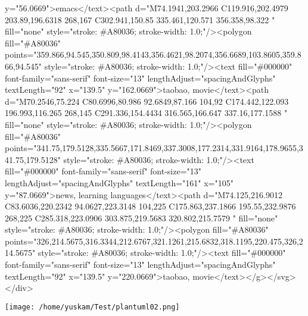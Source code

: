 \documentclass[11pt]{article}
\begin{document}
\begin{HTML}
y="56.0669">emacs</text><path d="M74.1941,203.2966 C119.916,202.4979 203.89,196.6318 268,167 C302.941,150.85 335.461,120.571 356.358,98.322 " fill="none" style="stroke: \#A80036; stroke-width: 1.0;"/><polygon fill="\#A80036" points="359.866,94.545,350.809,98.4143,356.4621,98.2074,356.6689,103.8605,359.866,94.545" style="stroke: \#A80036; stroke-width: 1.0;"/><text fill="\#000000" font-family="sans-serif" font-size="13" lengthAdjust="spacingAndGlyphs" textLength="92" x="139.5" y="162.0669">taobao, movie</text><path d="M70.2546,75.224 C80.6996,80.986 92.6849,87.166 104,92 C174.442,122.093 196.993,116.265 268,145 C291.336,154.4434 316.565,166.647 337.16,177.1588 " fill="none" style="stroke: \#A80036; stroke-width: 1.0;"/><polygon fill="\#A80036" points="341.75,179.5128,335.5667,171.8469,337.3008,177.2314,331.9164,178.9655,341.75,179.5128" style="stroke: \#A80036; stroke-width: 1.0;"/><text fill="\#000000" font-family="sans-serif" font-size="13" lengthAdjust="spacingAndGlyphs" textLength="161" x="105" y="87.0669">news, learning languages</text><path d="M74.125,216.9012 C83.6036,220.2342 94.0627,223.3148 104,225 C175.863,237.1866 195.55,232.9876 268,225 C285.318,223.0906 303.875,219.5683 320.802,215.7579 " fill="none" style="stroke: \#A80036; stroke-width: 1.0;"/><polygon fill="\#A80036" points="326,214.5675,316.3344,212.6767,321.1261,215.6832,318.1195,220.475,326,214.5675" style="stroke: \#A80036; stroke-width: 1.0;"/><text fill="\#000000" font-family="sans-serif" font-size="13" lengthAdjust="spacingAndGlyphs" textLength="92" x="139.5" y="220.0669">taobao, movie</text></g></svg>
</div>
\end{HTML}


\texttt{[image: /home/yuskam/Test/plantuml02.png]}
\end{document}
